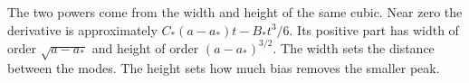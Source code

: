 The two powers come from the width and height of the same cubic.
Near zero the derivative is approximately $C_*(a-a_*)t-B_*t^3/6$.
Its positive part has width of order $\sqrt{a-a_*}$ and height of
order $(a-a_*)^{3/2}$. The width sets the distance between the modes.
The height sets how much bias removes the smaller peak.
